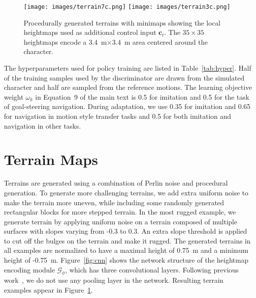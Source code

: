 \begin{figure}[t]
    \centering
    \texttt{[image: images/terrain7c.png]}\hfill
    \texttt{[image: images/terrain3c.png]}\vspace{-8pt}
    \caption{Procedurally generated terrains with minimaps showing the local heightmaps used as additional control input $\mathbf{c}_t$. The $35\times35$ heightmaps encode a 3.4~m$\times$3.4~m area centered around the character.
    }\vspace{-10pt}
    \label{fig:terrain_exp}
\end{figure}

The hyperparameters used for policy training are listed in Table~\ref{tab:hyper}.
Half of the training samples used by the discriminator are drawn from the simulated character and half are sampled from the reference motions.
The learning objective weight $\omega_k$ in Equation~9 of the main text %
is 0.5 for imitation and 0.5 for the task of goal-steering navigation.
During adaptation, we use 0.35 for imitation and 0.65 for navigation in
motion style transfer tasks and 0.5 for both imitation and navigation in other tasks.

\section{Terrain Maps}
Terrains are generated using a combination of Perlin noise 
and procedural generation.
To generate more challenging terrains,
we add extra uniform noise to make the terrain more uneven, while including some randomly generated rectangular blocks for more stepped terrain. 
In the most rugged
example, we generate terrain by applying uniform noise on a terrain composed of multiple surfaces with slopes varying from -0.3 to 0.3. An extra slope threshold is applied to cut off the bulges on the terrain and make it rugged.
The generated terrains in all %
examples are normalized to have a maximal height of 0.75~m and a minimum height of -0.75~m.
Figure~\ref{fig:cnn} shows the network structure of the heightmap encoding module $\mathcal{G}_\phi$, which has three convolutional layers.
Following previous work~\cite{mnih2013playing}, we do not use any pooling layer in the network.
Resulting terrain examples appear in Figure~\ref{fig:terrain_exp}.
